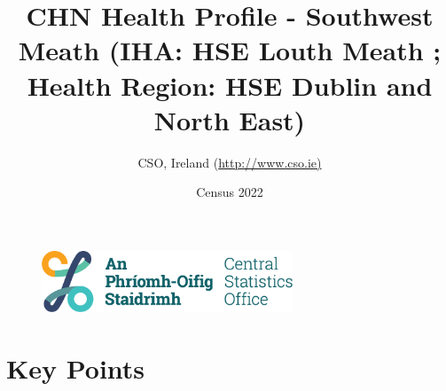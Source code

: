 \documentclass{article}
\title{CHN Health Profile - Southwest Meath (IHA: HSE Louth Meath ;  Health Region: HSE Dublin and North East) }
\date{Census 2022}
\author{CSO, Ireland  (\url{http://www.cso.ie)}}
\begin{document}


\begin{figure}
	\centering
\includegraphics[width =75mm]{../figures/CSO_Logo.png}
\end{figure}

				 
		   
						  
														  
																																													
												 
			 
\maketitle
					
													   
				 
						 
																																																																											   
				 
				  
  \pagebreak
    	    \tableofcontents

\pagebreak


\section{Key Points}
\end{document}
